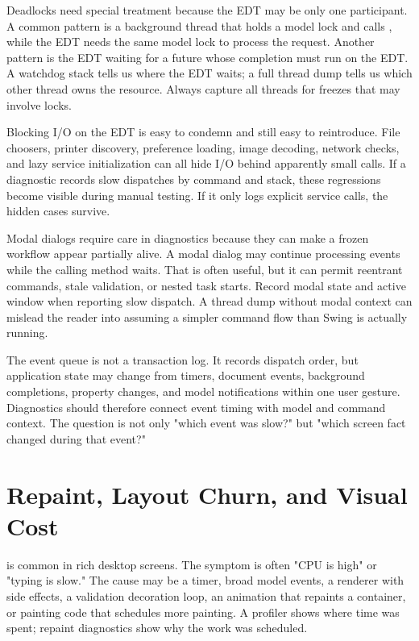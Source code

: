 Deadlocks need special treatment because the EDT may be only one participant. A common pattern is a background thread that holds a model lock and calls , while the EDT needs the same model lock to process the request. Another pattern is the EDT waiting for a future whose completion must run on the EDT. A watchdog stack tells us where the EDT waits; a full thread dump tells us which other thread owns the resource. Always capture all threads for freezes that may involve locks.

Blocking I/O on the EDT is easy to condemn and still easy to reintroduce. File choosers, printer discovery, preference loading, image decoding, network checks, and lazy service initialization can all hide I/O behind apparently small calls. If a diagnostic records slow dispatches by command and stack, these regressions become visible during manual testing. If it only logs explicit service calls, the hidden cases survive.

Modal dialogs require care in diagnostics because they can make a frozen workflow appear partially alive. A modal dialog may continue processing events while the calling method waits. That is often useful, but it can permit reentrant commands, stale validation, or nested task starts. Record modal state and active window when reporting slow dispatch. A thread dump without modal context can mislead the reader into assuming a simpler command flow than Swing is actually running.

The event queue is not a transaction log. It records dispatch order, but application state may change from timers, document events, background completions, property changes, and model notifications within one user gesture. Diagnostics should therefore connect event timing with model and command context. The question is not only "which event was slow?" but "which screen fact changed during that event?"

\section{Repaint, Layout Churn, and Visual Cost}

 is common in rich desktop screens. The symptom is often "CPU is high" or "typing is slow." The cause may be a timer, broad model events, a renderer with side effects, a validation decoration loop, an animation that repaints a container, or painting code that schedules more painting. A profiler shows where time was spent; repaint diagnostics show why the work was scheduled.

